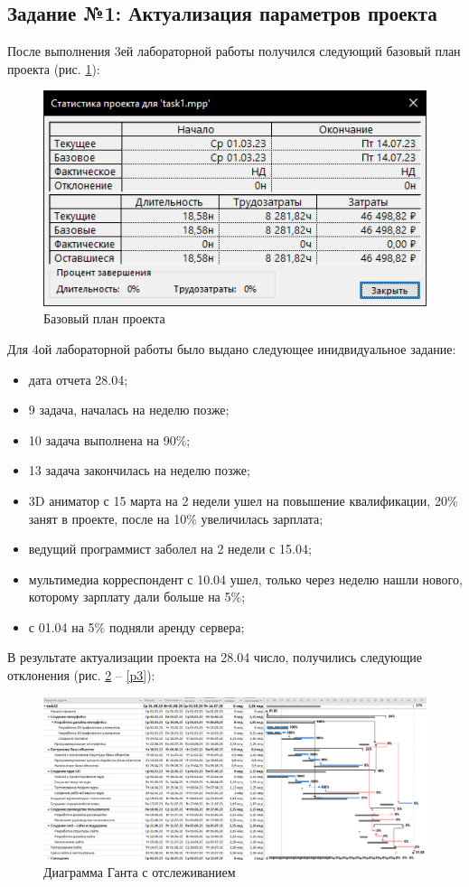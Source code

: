 \subsection*{Задание №1: Актуализация параметров проекта}
После выполнения 3ей лабораторной работы получился следующий базовый план проекта (рис. \ref{p1}):
\begin{figure}[!h]
	\centering
	\includegraphics[width=0.7\linewidth]{inc/img/1.png}
	\caption{Базовый план проекта}
	\label{p1}
\end{figure}

Для 4ой лабораторной работы было выдано следующее инидвидуальное задание:

\begin{itemize}
	\item дата отчета 28.04;
	\item 9 задача, началась на неделю позже;
	\item 10 задача выполнена на 90\%;
	\item 13 задача закончилась на неделю позже;
	\item 3D аниматор с 15 марта на 2 недели ушел на повышение квалификации, 20\% занят в проекте, после на 10\% увеличилась зарплата;
	\item ведущий программист заболел на 2 недели с 15.04;
	\item мультимедиа корреспондент с 10.04 ушел, только через неделю нашли нового, которому зарплату дали больше на 5\%;
	\item с 01.04 на 5\% подняли аренду сервера;
\end{itemize}

\newpage
В результате актуализации проекта на 28.04 число, получились следующие отклонения (рис. \ref{p2} -- \ref{p3}):
\begin{figure}[!h]
	\centering
	\includegraphics[width=1\linewidth]{inc/img/2.png}
	\caption{Диаграмма Ганта с отслеживанием}
	\label{p2}
\end{figure}

